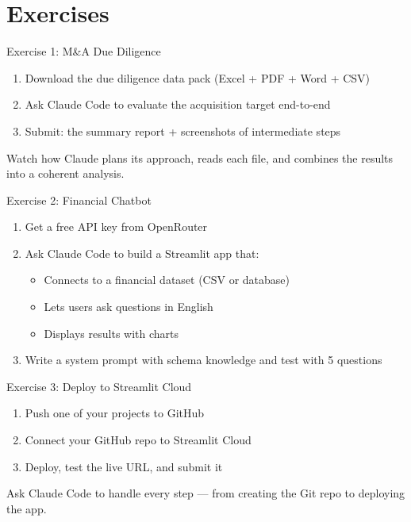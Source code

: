 \documentclass[aspectratio=169]{beamer}
\begin{document}
\section{Exercises}

\begin{frame}{Exercise 1: M\&A Due Diligence}
\begin{enumerate}
  \item Download the due diligence data pack (Excel + PDF + Word + CSV)
  \item Ask Claude Code to evaluate the acquisition target end-to-end
  \item Submit: the summary report + screenshots of intermediate steps
\end{enumerate}
\vspace{0.3cm}
Watch how Claude plans its approach, reads each file, and combines the results into a coherent analysis.
\end{frame}

\begin{frame}{Exercise 2: Financial Chatbot}
\begin{enumerate}
  \item Get a free API key from OpenRouter
  \item Ask Claude Code to build a Streamlit app that:
  \begin{itemize}\small
    \item Connects to a financial dataset (CSV or database)
    \item Lets users ask questions in English
    \item Displays results with charts
  \end{itemize}
  \item Write a system prompt with schema knowledge and test with 5 questions
\end{enumerate}
\end{frame}

\begin{frame}{Exercise 3: Deploy to Streamlit Cloud}
\begin{enumerate}
  \item Push one of your projects to GitHub
  \item Connect your GitHub repo to Streamlit Cloud
  \item Deploy, test the live URL, and submit it
\end{enumerate}
\vspace{0.3cm}
\alert{Ask Claude Code to handle every step} --- from creating the Git repo to deploying the app.
\end{frame}
\end{document}
